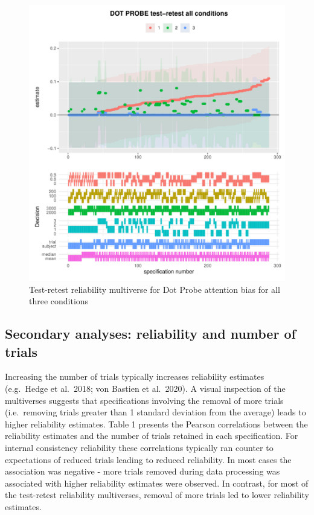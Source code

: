 \documentclass[
  man,floatsintext]{apa6}
\begin{document}
\begin{figure}
\centering
\includegraphics{Reliability_Multiverse_files/figure-latex/unnamed-chunk-16-1.pdf}
\caption{\label{fig:unnamed-chunk-16}Test-retest reliability multiverse for Dot Probe attention bias for all three conditions}
\end{figure}

\hypertarget{secondary-analyses-reliability-and-number-of-trials}{%
\subsection{Secondary analyses: reliability and number of trials}\label{secondary-analyses-reliability-and-number-of-trials}}

Increasing the number of trials typically increases reliability estimates (e.g.~Hedge et al.~2018; von Bastien et al.~2020). A visual inspection of the multiverses suggests that specifications involving the removal of more trials (i.e.~removing trials greater than 1 standard deviation from the average) leads to higher reliability estimates. Table 1 presents the Pearson correlations between the reliability estimates and the number of trials retained in each specification. For internal consistency reliability these correlations typically ran counter to expectations of reduced trials leading to reduced reliability. In most cases the association was negative - more trials removed during data processing was associated with higher reliability estimates were observed. In contrast, for most of the test-retest reliability multiverses, removal of more trials led to lower reliability estimates.
\end{document}
